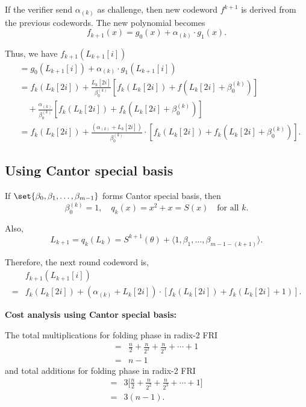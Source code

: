 \documentclass[11pt,runningheads]{llncs}
\begin{document}
If the verifier send $\alpha_{(k)}$ as challenge, then new codeword $f^{k+1}$ is derived from the previous codewords. The new polynomial becomes
\[f_{k+1}(x)=g_{0}(x)+\alpha_{(k)}\cdot g_{1}(x). \]

Thus, we have $f_{k+1}(L_{k+1}[i])$
\begin{equation*}
    \begin{aligned}
        &= g_0(L_{k+1}[i])+ \alpha_{(k)} \cdot g_1(L_{k+1}[i])\\
        &= f_{k}(L_{k}[2i]) + \frac{L_{k}[2i]}{\beta_{0}^{(k)}} [f_{k}(L_{k}[2i]) +  f(L_{k}[2i]+\beta_{0}^{(k)})]\\
        & \quad + \frac{\alpha_{(k)}}{\beta_{0}^{(k)}}[f_{k}(L_{k}[2i]) +  f_{k}(L_{k}[2i]+\beta_{0}^{(k)})]\\
        &= f_{k}(L_{k}[2i]) + \frac{(\alpha_{(k)}+ L_{k}[2i])}{\beta_{0}^{(k)}} \cdot [f_{k}(L_{k}[2i]) +  f_{k}(L_{k}[2i]+\beta_{0}^{(k)})].
    \end{aligned}
\end{equation*}

\subsection{Using Cantor special basis}
If $\set{\beta_{0},\beta_{1}, \dots,\beta_{m-1}}$ forms Cantor special basis, then   
\[\beta_{0}^{(k)}=1, \quad q_{k}(x)=x^2+x=S(x) \quad \text{for all } k.\]

Also, 
\[L_{k+1}=q_{k}(L_{k})= S^{k+1}(\theta)+ \langle 1,\beta_{1},\dots,\beta_{m-1-(k+1)} \rangle .\]

Therefore, the next round codeword is,
\begin{equation*}
    \begin{aligned}
        &f_{k+1}(L_{k+1}[i])\\
        =& f_{k}(L_{k}[2i]) + (\alpha_{(k)}+ L_{k}[2i]) \cdot [f_{k}(L_{k}[2i]) +  f_{k}(L_{k}[2i]+1)].
    \end{aligned}
\end{equation*}

\noindent \textbf{Cost analysis using Cantor special basis:}
\vspace{1em}

\noindent The total multiplications for folding phase in radix-2 FRI
\begin{equation*}
    \begin{aligned}
        =& \frac{n}{2} + \frac{n}{2^2}+ \frac{n}{2^3}+ \cdots + 1\\
        =& n-1
    \end{aligned}
\end{equation*}
and total additions for folding phase in radix-2 FRI
\begin{equation*}
    \begin{aligned}
        =& 3 \big[\frac{n}{2} + \frac{n}{2^2}+ \frac{n}{2^3}+ \cdots + 1 \big]\\
        =& 3(n-1).
    \end{aligned}
\end{equation*}
\end{document}
